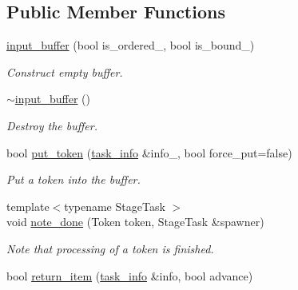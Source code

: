 \subsection*{Public Member Functions}
\begin{DoxyCompactItemize}
\item 
\hypertarget{classtbb_1_1internal_1_1input__buffer_af306f6984cef592fc73bdfd75bfbaf73}{}\hyperlink{classtbb_1_1internal_1_1input__buffer_af306f6984cef592fc73bdfd75bfbaf73}{input\+\_\+buffer} (bool is\+\_\+ordered\+\_\+, bool is\+\_\+bound\+\_\+)\label{classtbb_1_1internal_1_1input__buffer_af306f6984cef592fc73bdfd75bfbaf73}

\begin{DoxyCompactList}\small\item\em Construct empty buffer. \end{DoxyCompactList}\item 
\hypertarget{classtbb_1_1internal_1_1input__buffer_ac8ddc3a7821c785244756e64b15745c8}{}\hyperlink{classtbb_1_1internal_1_1input__buffer_ac8ddc3a7821c785244756e64b15745c8}{$\sim$input\+\_\+buffer} ()\label{classtbb_1_1internal_1_1input__buffer_ac8ddc3a7821c785244756e64b15745c8}

\begin{DoxyCompactList}\small\item\em Destroy the buffer. \end{DoxyCompactList}\item 
bool \hyperlink{classtbb_1_1internal_1_1input__buffer_a50267e19c26ebb25a8f31310f6496196}{put\+\_\+token} (\hyperlink{structtbb_1_1internal_1_1task__info}{task\+\_\+info} \&info\+\_\+, bool force\+\_\+put=false)
\begin{DoxyCompactList}\small\item\em Put a token into the buffer. \end{DoxyCompactList}\item 
{\footnotesize template$<$typename Stage\+Task $>$ }\\void \hyperlink{classtbb_1_1internal_1_1input__buffer_a869388f7823ccc3aa2c0a3af60798d1c}{note\+\_\+done} (Token token, Stage\+Task \&spawner)
\begin{DoxyCompactList}\small\item\em Note that processing of a token is finished. \end{DoxyCompactList}\item 
\hypertarget{classtbb_1_1internal_1_1input__buffer_a8dde2f58a75359799990a6dfa8541edd}{}bool \hyperlink{classtbb_1_1internal_1_1input__buffer_a8dde2f58a75359799990a6dfa8541edd}{return\+\_\+item} (\hyperlink{structtbb_1_1internal_1_1task__info}{task\+\_\+info} \&info, bool advance)\label{classtbb_1_1internal_1_1input__buffer_a8dde2f58a75359799990a6dfa8541edd}


\end{DoxyCompactItemize}
